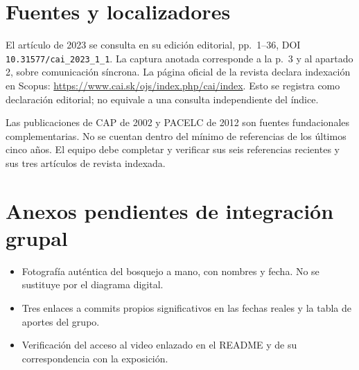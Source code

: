 \section*{Fuentes y localizadores}
El artículo de 2023 se consulta en su edición editorial, pp.~1--36, DOI \texttt{10.31577/cai\_2023\_1\_1}. La captura anotada corresponde a la p.~3 y al apartado 2, sobre comunicación síncrona. La página oficial de la revista declara indexación en Scopus: \url{https://www.cai.sk/ojs/index.php/cai/index}. Esto se registra como declaración editorial; no equivale a una consulta independiente del índice.

Las publicaciones de CAP de 2002 y PACELC de 2012 son fuentes fundacionales complementarias. No se cuentan dentro del mínimo de referencias de los últimos cinco años. El equipo debe completar y verificar sus seis referencias recientes y sus tres artículos de revista indexada.

\printbibliography[heading=none]
\section*{Anexos pendientes de integración grupal}
\begin{itemize}
\item Fotografía auténtica del bosquejo a mano, con nombres y fecha. No se sustituye por el diagrama digital.
\item Tres enlaces a commits propios significativos en las fechas reales y la tabla de aportes del grupo.
\item Verificación del acceso al video enlazado en el README y de su correspondencia con la exposición.
\end{itemize}
